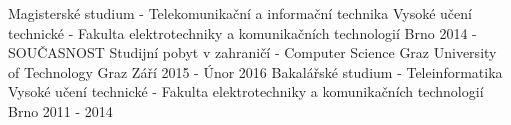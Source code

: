 

\begin{cventries}

  \cventry
    {Magisterské studium - Telekomunikační a informační technika}
    {Vysoké učení technické - Fakulta elektrotechniky a komunikačních technologií}
    {Brno}
    {2014 - SOUČASNOST}
    {}
  \cventry
    {Studijní pobyt v zahraničí - Computer Science}
    {Graz University of Technology}
    {Graz}
    {Září 2015 - Únor 2016}
    {}
  \cventry
    {Bakalářské studium - Teleinformatika} %
    {Vysoké učení technické - Fakulta elektrotechniky a komunikačních technologií} %
    {Brno} %
    {2011 - 2014} %
    {}
    
    

\end{cventries}
